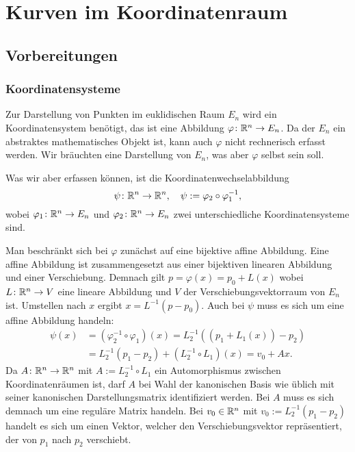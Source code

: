 

\chapter{Kurven im Koordinatenraum}

\section{Vorbereitungen}

\subsection{Koordinatensysteme}\label{section:Koordinatensysteme}

Zur Darstellung von Punkten im euklidischen Raum $E_n$ wird ein
Koordinatensystem benötigt, das ist eine Abbildung
$\varphi\colon\mathbb R^n\to E_n$. Da der $E_n$ ein abstraktes mathematisches
Objekt ist, kann auch $\varphi$ nicht rechnerisch erfasst werden.
Wir bräuchten eine Darstellung von $E_n$, was aber $\varphi$ selbst
sein soll.

Was wir aber erfassen können, ist die Koordinatenwechselabbildung%
\begin{equation}
\psi\colon\mathbb R^n\to\mathbb R^n,\quad \psi := \varphi_2\circ\varphi_1^{-1},
\end{equation}
wobei $\varphi_1\colon\mathbb R^n\to E_n$ und $\varphi_2\colon\mathbb R^n\to E_n$
zwei unterschiedliche Koordinatensysteme sind.

Man beschränkt sich bei $\varphi$ zunächst
auf eine bijektive affine Abbildung. Eine affine Abbildung ist
zusammengesetzt aus einer bijektiven linearen Abbildung und einer
Verschiebung. Demnach gilt $p=\varphi(x) = p_0+L(x)$ wobei
$L\colon\mathbb R^n\to V$ eine lineare Abbildung und $V$ der
Verschiebungsvektorraum von $E_n$ ist. Umstellen nach $x$ ergibt
$x=L^{-1}(p-p_0)$. Auch bei $\psi$ muss es sich um eine affine
Abbildung handeln:%
\begin{align}
\psi(x) &= (\varphi_2^{-1}\circ\varphi_1)(x)= L_2^{-1}((p_1+L_1(x))-p_2)\\
&= L_2^{-1}(p_1-p_2)+(L_2^{-1}\circ L_1)(x) = v_0+Ax.
\end{align}
Da $A\colon\mathbb R^n\to\mathbb R^n$ mit $A:=L_2^{-1}\circ L_1$ ein Automorphismus
zwischen Koordinatenräumen ist, darf $A$ bei Wahl der kanonischen Basis
wie üblich mit seiner kanonischen Darstellungsmatrix identifiziert
werden. Bei $A$ muss es sich demnach um eine reguläre Matrix handeln.
Bei $v_0\in\mathbb R^n$ mit
$v_0:=L_2^{-1}(p_1-p_2)$ handelt es sich um einen Vektor, welcher den
Verschiebungsvektor repräsentiert, der von $p_1$ nach $p_2$ verschiebt.

